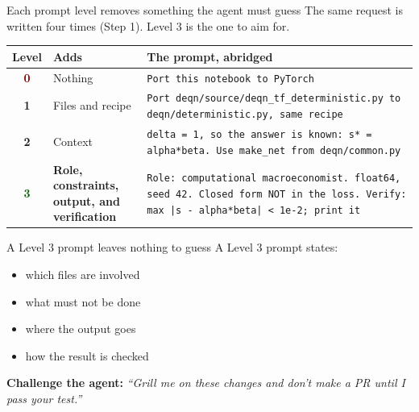 \documentclass[aspectratio=169,10pt]{beamer}
\newcommand{\emphc}[1]{\textcolor{harvardcrimson}{#1}}
\newcommand{\boristip}[1]{%
  \tikz[baseline=(X.base)]{\node[fill=level4,text=white,
  rounded corners=2pt,inner sep=2pt,font=\tiny\bfseries](X){TIP #1};}}
\begin{document}
\begin{frame}[fragile]{Each prompt level removes something the agent must guess}
The same request is written four times (Step 1). \emphc{Level 3 is the one to aim for.}

\vspace{0.5em}
\begin{center}
\small
\renewcommand{\arraystretch}{1.45}
\begin{tabular}{@{}c >{\raggedright\arraybackslash}p{3.0cm} >{\raggedright\arraybackslash}p{9.0cm}@{}}
\toprule
\textbf{Level} & \textbf{Adds} & \textbf{The prompt, abridged} \\
\midrule
\textcolor{darkred}{\textbf{0}} & Nothing & \texttt{Port this notebook to PyTorch} \\
\textbf{1} & Files and recipe & \texttt{Port deqn/source/deqn\_tf\_deterministic.py to deqn/deterministic.py, same recipe} \\
\textbf{2} & Context & \texttt{delta = 1, so the answer is known: s* = alpha*beta. Use make\_net from deqn/common.py} \\
\rowcolor{softgreen!10}
\textcolor{darkgreen}{\textbf{3}} & \textbf{Role, constraints, output, and verification} & \texttt{Role: computational macroeconomist. float64, seed 42. Closed form NOT in the loss. Verify: max |s - alpha*beta| < 1e-2; print it} \\
\bottomrule
\end{tabular}
\end{center}
\end{frame}

\begin{frame}{A Level 3 prompt leaves nothing to guess}
A Level 3 prompt states:
\begin{itemize}\itemsep8pt
  \item which files are involved
  \item what must not be done
  \item where the output goes
  \item how the result is checked
\end{itemize}

\vspace{1.1em}
\boristip{6} \textbf{Challenge the agent:} {\itshape ``Grill me on these changes and don't make a PR until I pass your test.''}
\end{frame}
\end{document}
